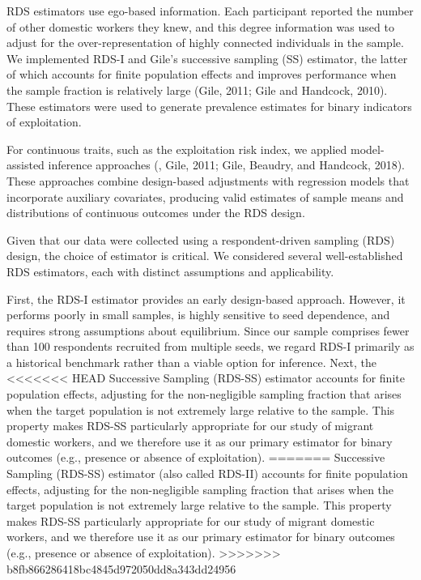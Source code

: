 \documentclass[
  12pt,
  letterpaper,
  DIV=11,
  numbers=noendperiod]{scrartcl}
\theoremstyle{plain}
\theoremstyle{definition}
\begin{document}
RDS estimators use ego-based information. Each participant reported the
number of other domestic workers they knew, and this degree information
was used to adjust for the over-representation of highly connected
individuals in the sample. We implemented RDS-I and Gile's successive
sampling (SS) estimator, the latter of which accounts for finite
population effects and improves performance when the sample fraction is
relatively large (Gile, 2011; Gile and Handcock, 2010). These estimators
were used to generate prevalence estimates for binary indicators of
exploitation.

For continuous traits, such as the exploitation risk index, we applied
model-assisted inference approaches (\textcite{gile15-network}, Gile,
2011; Gile, Beaudry, and Handcock, 2018). These approaches combine
design-based adjustments with regression models that incorporate
auxiliary covariates, producing valid estimates of sample means and
distributions of continuous outcomes under the RDS design.

Given that our data were collected using a respondent-driven sampling
(RDS) design, the choice of estimator is critical. We considered several
well-established RDS estimators, each with distinct assumptions and
applicability.

First, the RDS-I estimator \textcite{salg04-sampling} provides an early
design-based approach. However, it performs poorly in small samples, is
highly sensitive to seed dependence, and requires strong assumptions
about equilibrium. Since our sample comprises fewer than 100 respondents
recruited from multiple seeds, we regard RDS-I primarily as a historical
benchmark rather than a viable option for inference.\autocite[\^{} The
Volz--Heckathorn (VH) estimator][ offers a probability-based refinement
of RDS-I. It is more robust but assumes a large population relative to
the sample size and does not adjust for finite-population effects.
Although our diagnostic checks indicated approximate equilibrium across
key demographics, the VH estimator is best used here as a robustness
check rather than the primary estimator.]{volz08-probability} Next, the
<<<<<<< HEAD
Successive Sampling (RDS-SS) estimator \autocite{gile11-improved}
accounts for finite population effects, adjusting for the non-negligible
sampling fraction that arises when the target population is not
extremely large relative to the sample. This property makes RDS-SS
particularly appropriate for our study of migrant domestic workers, and
we therefore use it as our primary estimator for binary outcomes (e.g.,
presence or absence of exploitation).
=======
Successive Sampling (RDS-SS) estimator (also called RDS-II)
\textcite{gile11-improved} accounts for finite population effects,
adjusting for the non-negligible sampling fraction that arises when the
target population is not extremely large relative to the sample. This
property makes RDS-SS particularly appropriate for our study of migrant
domestic workers, and we therefore use it as our primary estimator for
binary outcomes (e.g., presence or absence of exploitation).
>>>>>>> b8fb866286418bc4845d972050dd8a343dd24956
\end{document}
